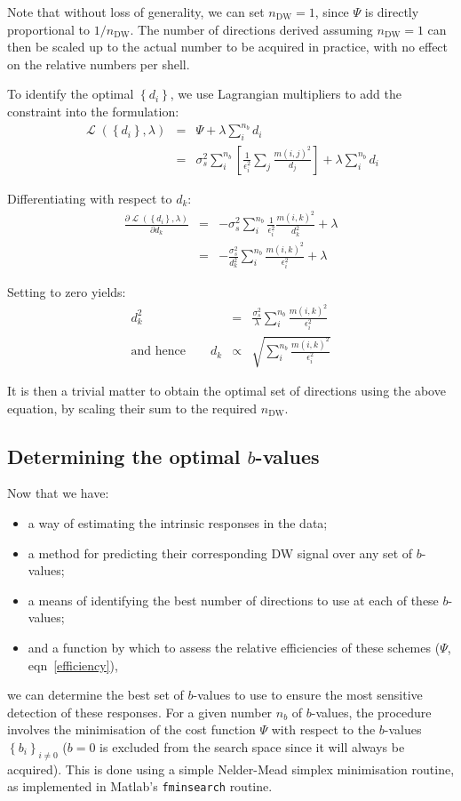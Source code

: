 \documentclass{article}
\newcommand{\nDW}{n_{\textrm{DW}}}
\DeclareMathOperator{\Lagr}{\mathcal{L}}
\begin{document}
Note that without loss of generality, we can set $\nDW = 1$, since $\Psi$ is
directly proportional to $1/\nDW$. The number of directions derived
assuming $\nDW=1$ can then be scaled up to the actual number to be acquired in
practice, with no effect on the relative numbers per shell. 

To identify the optimal $\left\{ d_i \right\}$, we use Lagrangian multipliers to add the constraint into the formulation:
\begin{eqnarray}
\Lagr (\left\{ d_i \right\}, \lambda) & = & \Psi + \lambda \sum_i^{n_b} d_i \\
& = & \sigma_s^2 \sum_i^{n_b} \left[ \frac{1}{\epsilon_i^2} \sum_j \frac{ m(i,j)^2 }{ d_j } \right] + \lambda \sum_i^{n_b} d_i 
\end{eqnarray}

Differentiating with respect to $d_k$:
\begin{eqnarray}
\frac {\partial \Lagr (\left\{ d_i \right\}, \lambda)}{\partial d_k} & = & - \sigma_s^2 \sum_i^{n_b} \frac{1}{\epsilon_i^2} \frac{ m(i,k)^2 }{ d_k^2 } + \lambda  \\
& = & - \frac{\sigma_s^2}{d_k^2} \sum_i^{n_b} \frac{m(i,k)^2}{\epsilon_i^2} + \lambda
\end{eqnarray}

Setting to zero yields:
\begin{eqnarray}
d_k^2 & = & \frac{\sigma_s^2}{\lambda} \sum_i^{n_b} \frac{m(i,k)^2}{\epsilon_i^2} \\
\textrm{and hence} \qquad d_k & \propto & \sqrt {\sum_i^{n_b} \frac{m(i,k)^2}{\epsilon_i^2} }
\end{eqnarray}

It is then a trivial matter to obtain the optimal set of directions using the
above equation, by scaling their sum to the required $\nDW$.


\subsection{Determining the optimal $b$-values}

Now that we have:
\begin{itemize}
\item a way of estimating the intrinsic responses in the data;
\item a method for predicting their corresponding DW signal over any set of $b$-values;
\item a means of identifying the best number of directions to use at each of these $b$-values;
\item and a function by which to assess the relative efficiencies of these schemes ($\Psi$, eqn~\ref{efficiency}),
\end{itemize}
we can determine the best set of $b$-values to use to ensure the most sensitive
detection of these responses. For a given number $n_b$ of $b$-values, the
procedure involves the minimisation of the cost function $\Psi$ with respect to
the $b$-values $\left\{ b_i \right\}_{i\neq 0}$ ($b=0$ is excluded from the
search space since it will always be acquired). This is done using a simple
Nelder-Mead simplex minimisation routine, as implemented in Matlab's
\texttt{fminsearch} routine. 
\end{document}
